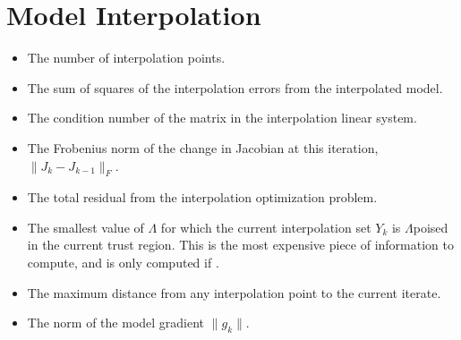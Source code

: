 \documentclass[letterpaper,10pt,english]{sphinxmanual}
\begin{document}
\section{Model Interpolation}
\label{\detokenize{diagnostic:model-interpolation}}\begin{itemize}
\item {} 
\sphinxAtStartPar
{} \sphinxhyphen{} The number of interpolation points.

\item {} 
\sphinxAtStartPar
{} \sphinxhyphen{} The sum of squares of the interpolation errors from the interpolated model.

\item {} 
\sphinxAtStartPar
{} \sphinxhyphen{} The condition number of the matrix in the interpolation linear system.

\item {} 
\sphinxAtStartPar
{} \sphinxhyphen{} The Frobenius norm of the change in Jacobian at this iteration, \(\|J_k-J_{k-1}\|_F\).

\item {} 
\sphinxAtStartPar
{} \sphinxhyphen{} The total residual from the interpolation optimization problem.

\item {} 
\sphinxAtStartPar
{} \sphinxhyphen{} The smallest value of \(\Lambda\) for which the current interpolation set \(Y_k\) is \(\Lambda\)\sphinxhyphen{}poised in the current trust region. This is the most expensive piece of information to compute, and is only computed if \sphinxcode{\sphinxupquote{user\_params{[}\textquotesingle{}logging.save\_poisedness\textquotesingle{} = True}}.

\item {} 
\sphinxAtStartPar
{} \sphinxhyphen{} The maximum distance from any interpolation point to the current iterate.

\item {} 
\sphinxAtStartPar
{} \sphinxhyphen{} The norm of the model gradient \(\|g_k\|\).

\end{itemize}
\end{document}
